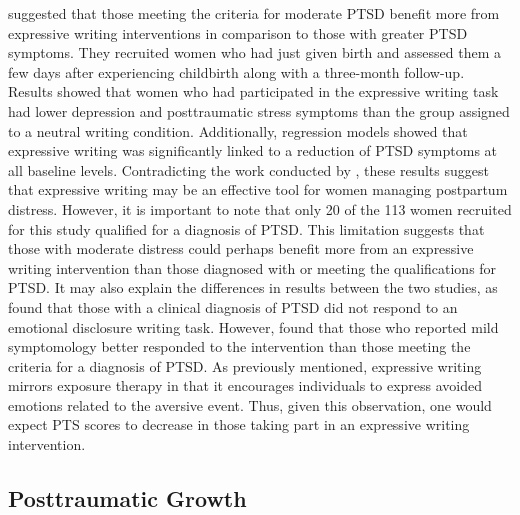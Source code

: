 \documentclass[english,man]{apa6}
\theoremstyle{definition}
\theoremstyle{definition}
\theoremstyle{definition}
\theoremstyle{remark}
\begin{document}
\textcite{Blasio2015a} suggested that those meeting the criteria for
moderate PTSD benefit more from expressive writing interventions in
comparison to those with greater PTSD symptoms. They recruited women who
had just given birth and assessed them a few days after experiencing
childbirth along with a three-month follow-up. Results showed that women
who had participated in the expressive writing task had lower depression
and posttraumatic stress symptoms than the group assigned to a neutral
writing condition. Additionally, regression models showed that
expressive writing was significantly linked to a reduction of PTSD
symptoms at all baseline levels. Contradicting the work conducted by
\textcite{Sloan2011a}, these results suggest that expressive writing may
be an effective tool for women managing postpartum distress. However, it
is important to note that only 20 of the 113 women recruited for this
study qualified for a diagnosis of PTSD. This limitation suggests that
those with moderate distress could perhaps benefit more from an
expressive writing intervention than those diagnosed with or meeting the
qualifications for PTSD. It may also explain the differences in results
between the two studies, as \textcite{Sloan2011a} found that those with
a clinical diagnosis of PTSD did not respond to an emotional disclosure
writing task. However, \textcite{Blasio2015a} found that those who
reported mild symptomology better responded to the intervention than
those meeting the criteria for a diagnosis of PTSD. As previously
mentioned, expressive writing mirrors exposure therapy in that it
encourages individuals to express avoided emotions related to the
aversive event. Thus, given this observation, one would expect PTS
scores to decrease in those taking part in an expressive writing
intervention.

\subsection{Posttraumatic Growth}\label{posttraumatic-growth}
\end{document}
